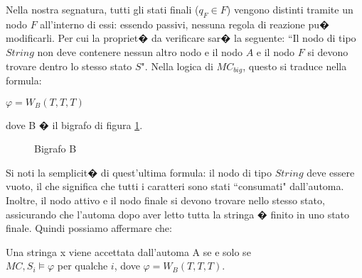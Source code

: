 Nella nostra segnatura, tutti gli stati finali ($q_F \in F$) vengono distinti tramite un nodo $F$ all'interno di essi: essendo passivi, nessuna regola di reazione pu� modificarli. Per cui la propriet� da verificare sar� la seguente: ``Il nodo di tipo $String$ non deve contenere nessun altro nodo e il nodo $A$ e il nodo $F$ si devono trovare dentro lo stesso stato $S$". Nella logica di $MC_{big}$, questo si traduce nella formula:
\begin{center}
$\varphi = W_B(T,T,T)$
\end{center}
dove B � il bigrafo di figura \ref{fig:bigAimNFA}.

\begin{figure}[th]
\centering
{}
\caption{Bigrafo B \label{fig:bigAimNFA}}
\end{figure}


Si noti la semplicit� di quest'ultima formula: il nodo di tipo $String$ deve essere vuoto, il che significa che tutti i caratteri sono stati ``consumati" dall'automa. Inoltre, il nodo attivo e il nodo finale si devono trovare nello stesso stato, assicurando che l'automa dopo aver letto tutta la stringa � finito in uno stato finale. Quindi possiamo affermare che:
\begin{prop}\label{prop:strWario}
Una stringa x viene accettata dall'automa A se e solo se \\$MC,S_i \models \varphi$ per qualche $i$, dove $\varphi = W_B(T,T,T)$.
\end{prop}

